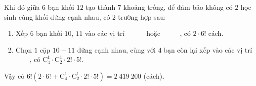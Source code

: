 \begin{ex}
{\begin{itemchoice}
\begin{center}
			\end{center}
			Khi đó giữa $6$ bạn khối $12$ tạo thành $7$ khoảng trống, để đảm bảo không có $2$ học sinh cùng  khối đứng cạnh nhau, có $2$ trường hợp sau:
			\begin{enumerate}
				\item [TH1.] Xếp $6$ bạn khối $10$, $11$ vào các vị trí {\color{teal}}\ {\color{teal}}\ {\color{teal}}\  {\color{teal}}\ {\color{teal}}\ {\color{teal}} hoặc {\color{teal}}\ {\color{teal}}\ {\color{teal}}\ {\color{teal}}\ {\color{teal}}\ {\color{teal}}, có $2\cdot 6!$ cách.
				\item [TH2.] Chọn $1$ cặp $10-11$ đứng cạnh nhau, cùng với $4$ bạn  còn lại xếp vào các vị trí {\color{teal}}\ {\color{teal}}\ {\color{teal}}\ {\color{teal}}\ {\color{teal}}, có $\mathrm{C}_4^1\cdot \mathrm{C}_2^1\cdot 2!\cdot 5!$.
			\end{enumerate}
			 Vậy có $6!\left(2\cdot 6!+\mathrm{C}_4^1\cdot \mathrm{C}_2^1\cdot 2!\cdot 5!\right)=2\ 419\ 200$ (cách).
		\end{itemchoice}
	 }
\end{ex}
